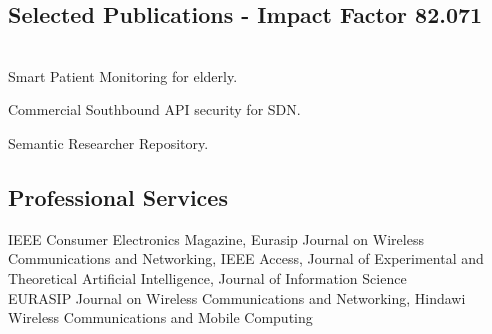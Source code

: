 \documentclass[]{resume-openfont}
\begin{document}
\begin{minipage}[t]{0.66\textwidth}
\subsection{Selected Publications - Impact Factor 82.071}
\renewcommand\refname{\vskip -1.5em} %


\nocite{*}
\sectionsep

\\
Smart Patient Monitoring for elderly.  

Commercial Southbound API security for SDN.  
\sectionsep

Semantic Researcher Repository.
\sectionsep


\subsection{Professional Services}
IEEE Consumer Electronics Magazine, Eurasip Journal on Wireless Communications and Networking, IEEE Access, Journal of Experimental and Theoretical Artificial Intelligence, Journal of Information Science\\
EURASIP Journal on Wireless Communications and Networking, Hindawi Wireless Communications and Mobile Computing
\end{minipage}
\end{document}
